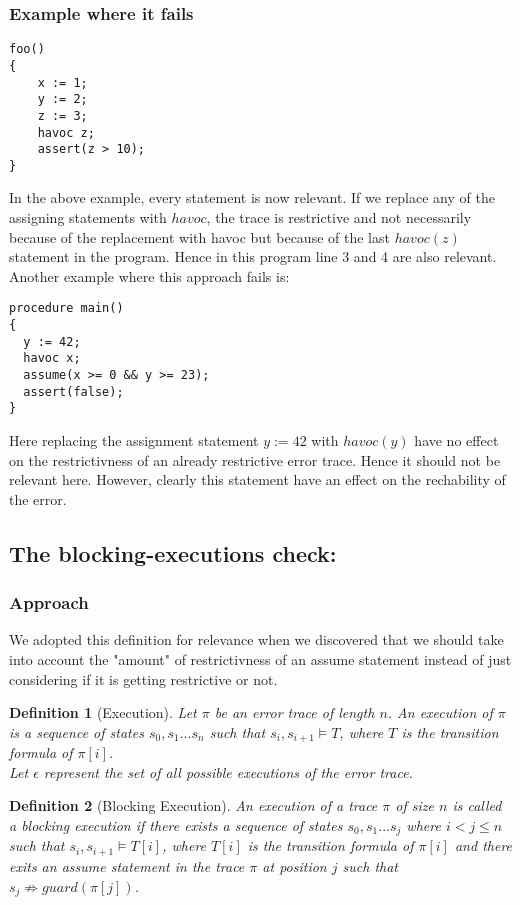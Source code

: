 \documentclass{article}
\newcommand{\limp}{\Rightarrow}
\newtheorem{mydef}{Definition}
\begin{document}
\subsubsection{Example where it fails}
\begin{lstlisting}
foo()
{
	x := 1;
	y := 2;
	z := 3;
	havoc z;
	assert(z > 10);
}
\end{lstlisting}
In the above example, every statement is now relevant. If we replace any of the assigning statements with $havoc$, the trace is restrictive and not necessarily because of the replacement with havoc but because of the last $havoc(z)$ statement in the program. Hence in this program line 3 and 4 are also relevant.\\
Another example where this approach fails is:
\begin{lstlisting}
procedure main()
{
  y := 42;
  havoc x;
  assume(x >= 0 && y >= 23);
  assert(false);
}
\end{lstlisting}
Here replacing the assignment statement $y:=42$ with $havoc(y)$ have no effect on the restrictivness of an already restrictive error trace. Hence it should not be relevant here. However, clearly this statement have an effect on the rechability of the error.
\subsection{The blocking-executions check:}
\subsubsection{Approach}
We adopted this definition for relevance when we discovered that we should take into account the "amount" of restrictivness of an assume statement instead of just considering if it is getting restrictive or not. 
\begin{mydef}[Execution]\label{mydef:execution_definition}
Let $\pi$ be an error trace of length $n$. An execution of $\pi$ is a sequence of states $s_0, s_1...s_n$ such that $s_i, s_{i+1} \models T$, where $T$ is the transition formula of $\pi[i]$. \\
Let $\epsilon$ represent the set of all possible executions of the error trace.
\end{mydef}

\begin{mydef}[Blocking Execution]\label{mydef:blockingexecution_definition}
An execution of a trace $\pi$ of size $n$ is called a blocking execution if there exists a sequence of states $s_0, s_1...s_j$ where $i<j \leq n$ such that $s_i, s_{i+1} \models T[i]$, where $T[i]$ is the transition formula of $\pi[i]$ and there exits an assume statement in the trace $\pi$ at position $j$ such that $s_{j} \not \limp guard(\pi[j])$.
\end{mydef}
\end{document}
